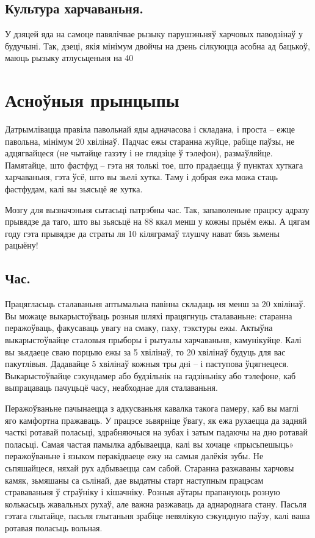 \subsection{Культура харчаваньня.}
У дзяцей яда на самоце павялічвае рызыку парушэньняў харчовых паводзінаў у будучыні. Так, дзеці, якія мінімум двойчы на дзень сілкуюцца асобна ад бацькоў, маюць рызыку атлусьценьня на 40%

\section{Асноўныя прынцыпы}

Датрымлівацца правіла павольнай яды адначасова і складана, і проста – ежце павольна, мінімум 20 хвілінаў. Падчас ежы старанна жуйце, рабіце паўзы, не адцягвайцеся (не чытайце газэту і не глядзіце ў тэлефон), размаўляйце. Памятайце, што фастфуд – гэта ня толькі тое, што прадаецца ў пунктах хуткага харчаваньня, гэта ўсё, што вы зьелі хутка. Таму і добрая ежа можа стаць фастфудам, калі вы зьясьцё яе хутка.

Мозгу для вызначэньня сытасьці патрэбны час. Так, запаволеньне працэсу адразу прывядзе да таго, што вы зьясьцё на 88 ккал менш у кожны прыём ежы. А цягам году гэта прывядзе да страты ля 10 кіляграмаў тлушчу нават бязь зьмены рацыёну!

\subsection{Час.}
Працягласьць сталаваньня аптымальна павінна складаць ня менш за 20 хвілінаў. Вы можаце выкарыстоўваць розныя шляхі працягнуць сталаваньне: старанна перажоўваць, факусаваць увагу на смаку, паху, тэкстуры ежы. Актыўна выкарыстоўвайце сталовыя прыборы і рытуалы харчаваньня, камунікуйце. Калі вы зьядаеце сваю порцыю ежы за 5 хвілінаў, то 20 хвілінаў будуць для вас пакутлівыя. Дадавайце 5 хвілінаў кожныя тры дні – і паступова ўцягнецеся. Выкарыстоўвайце сэкундамер або будзільнік на гадзіньніку або тэлефоне, каб выпрацаваць пачуцьцё часу, неабходнае для сталаваньня.

Перажоўваньне пачынаецца з адкусваньня кавалка такога памеру, каб вы маглі яго камфортна пражаваць. У працэсе зьвярніце ўвагу, як ежа рухаецца да задняй часткі ротавай поласьці, здрабняючыся на зубах і затым падаючы на дно ротавай поласьці. Самая частая памылка адбываецца, калі вы хочаце «прысьпешыць» перажоўваньне і языком перакідваеце ежу на самыя далёкія зубы. Не сьпяшайцеся, няхай рух адбываецца сам сабой. Старанна разжаваны харчовы камяк, зьмяшаны са сьлінай, дае выдатны старт наступным працэсам страваваньня ў страўніку і кішачніку. Розныя аўтары прапануюць розную колькасьць жавальных рухаў, але важна разжаваць да аднароднага стану. Пасьля гэтага глытайце, пасьля глытаньня зрабіце невялікую сэкундную паўзу, калі ваша ротавая поласьць вольная.

